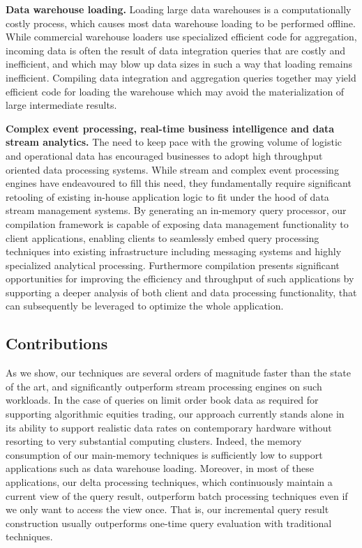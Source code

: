 \textbf{Data warehouse loading.}  Loading large data warehouses is a
computationally costly process, which causes most data warehouse loading to be
performed offline.  While commercial warehouse loaders use specialized efficient
code for aggregation, incoming data is often the result of data integration
queries that are costly and inefficient, and which may blow up data sizes in
such a way that loading remains inefficient.  Compiling data integration and
aggregation queries together may yield efficient code for loading the warehouse
which may avoid the materialization of large intermediate results.


\textbf{Complex event processing, real-time business intelligence and data
stream analytics.}  The need to keep pace with the growing volume of logistic
and operational data has encouraged businesses to adopt high throughput oriented
data processing systems. While stream and complex event processing engines have
endeavoured to fill this need, they fundamentally require significant retooling
of existing in-house application logic to fit under the hood of data stream
management systems. By generating an in-memory query processor, our compilation
framework is capable of exposing data management functionality to client
applications, enabling clients to seamlessly embed query processing techniques
into existing infrastructure including messaging systems and highly specialized
analytical processing. Furthermore compilation presents significant
opportunities for improving the efficiency and throughput of such applications
by supporting a deeper analysis of both client and data processing
functionality, that can subsequently be leveraged to optimize the whole
application.

\medskip


\subsection{Contributions}


As we show, our techniques are several orders of magnitude faster than the state
of the art, and significantly outperform stream processing engines on such
workloads.  In the case of queries on limit order book data as required for
supporting algorithmic equities trading, our approach currently stands alone in
its ability to support realistic data rates on contemporary hardware without
resorting to very substantial computing clusters. Indeed, the memory consumption
of our main-memory techniques is sufficiently low to support applications such
as data warehouse loading. Moreover, in most of these applications, our delta
processing techniques, which continuously maintain a current view of the query
result, outperform batch processing techniques even if we only want to access
the view once. That is, our incremental query result construction usually
outperforms one-time query evaluation with traditional techniques.


